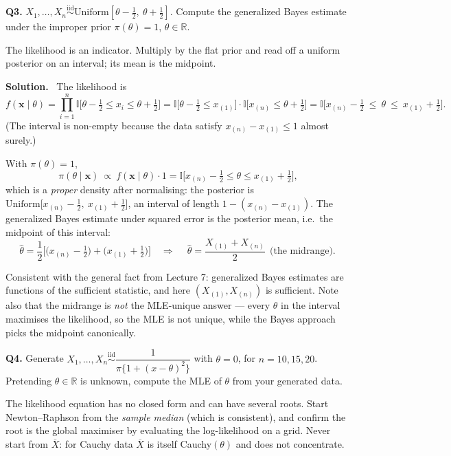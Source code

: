 \documentclass[11pt]{article}
\newcommand{\R}{\mathbb{R}}
\newcommand{\Xbar}{\overline{X}}
\newcommand{\iid}{\overset{\text{iid}}{\sim}}
\newenvironment{prob}[1]{\medskip\noindent\textbf{\large #1}\quad}{\par}
\newcommand{\soln}{\medskip\noindent\textbf{Solution.}\ }
\begin{document}
\bigskip
\begin{prob}{Q3.}
$X_1,\dots,X_n\iid \mathrm{Uniform}[\theta-\tfrac12,\ \theta+\tfrac12]$. Compute the
generalized Bayes estimate under the improper prior $\pi(\theta)=1$, $\theta\in\R$.
\end{prob}

\begin{ideabox}
The likelihood is an indicator. Multiply by the flat prior and read off a uniform posterior on
an interval; its mean is the midpoint.
\end{ideabox}

\soln
The likelihood is
\[
f(\mathbf{x}\mid\theta)=\prod_{i=1}^n\mathbb{I}\Big[\theta-\tfrac12\le x_i\le\theta+\tfrac12\Big]
=\mathbb{I}\Big[\theta-\tfrac12\le x_{(1)}\Big]\cdot\mathbb{I}\Big[x_{(n)}\le\theta+\tfrac12\Big]
=\mathbb{I}\Big[x_{(n)}-\tfrac12\ \le\ \theta\ \le\ x_{(1)}+\tfrac12\Big].
\]
(The interval is non-empty because the data satisfy $x_{(n)}-x_{(1)}\le1$ almost surely.)

With $\pi(\theta)=1$,
\[
\pi(\theta\mid\mathbf{x})\ \propto\ f(\mathbf{x}\mid\theta)\cdot1
=\mathbb{I}\Big[x_{(n)}-\tfrac12\le\theta\le x_{(1)}+\tfrac12\Big],
\]
which is a \emph{proper} density after normalising: the posterior is
$\mathrm{Uniform}\big[x_{(n)}-\tfrac12,\ x_{(1)}+\tfrac12\big]$, an interval of length
$1-(x_{(n)}-x_{(1)})$. The generalized Bayes estimate under squared error is the posterior
mean, i.e.\ the midpoint of this interval:
\[
\hat\theta=\frac12\Big[\big(x_{(n)}-\tfrac12\big)+\big(x_{(1)}+\tfrac12\big)\Big]
\quad\Longrightarrow\quad
\boxed{\ \hat\theta=\frac{X_{(1)}+X_{(n)}}{2}\ \ \text{(the midrange).}\ }
\]

\begin{notebox}
Consistent with the general fact from Lecture 7: generalized Bayes estimates are functions of
the sufficient statistic, and here $(X_{(1)},X_{(n)})$ is sufficient. Note also that the
midrange is \emph{not} the MLE-unique answer --- every $\theta$ in the interval maximises the
likelihood, so the MLE is not unique, while the Bayes approach picks the midpoint canonically.
\end{notebox}

\bigskip
\begin{prob}{Q4.}
Generate $X_1,\dots,X_n\iid \dfrac{1}{\pi\{1+(x-\theta)^2\}}$ with $\theta=0$, for
$n=10,15,20$. Pretending $\theta\in\R$ is unknown, compute the MLE of $\theta$ from your
generated data.
\end{prob}

\begin{ideabox}
The likelihood equation has no closed form and can have several roots. Start Newton--Raphson
from the \emph{sample median} (which is consistent), and confirm the root is the global
maximiser by evaluating the log-likelihood on a grid. Never start from $\Xbar$: for Cauchy
data $\Xbar$ is itself Cauchy$(\theta)$ and does not concentrate.
\end{ideabox}
\end{document}
